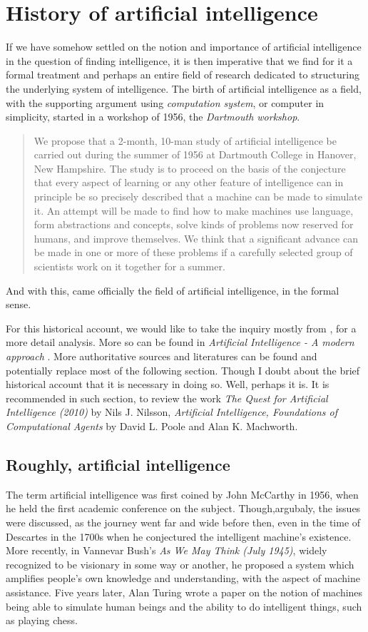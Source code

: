 \section{History of artificial intelligence}

If we have somehow settled on the notion and importance of artificial intelligence in the question of finding intelligence, it is then imperative that we find for it a formal treatment and perhaps an entire field of research dedicated to structuring the underlying system of intelligence. The birth of artificial intelligence as a field, with the supporting argument using \textit{computation system}, or computer in simplicity, started in a workshop of 1956, the \textit{Dartmouth workshop}. 

\blockquote{We propose that a 2-month, 10-man study of artificial intelligence be carried out during the summer of 1956 at Dartmouth College in Hanover, New Hampshire. The study is to proceed on the basis of the conjecture that every aspect of learning or any other feature of intelligence can in principle be so precisely described that a machine can be made to simulate it. An attempt will be made to find how to make machines use language, form abstractions and concepts, solve kinds of problems now reserved for humans, and improve themselves. We think that a significant advance can be made in one or more of these problems if a carefully selected group of scientists work on it together for a summer.}

And with this, came officially the field of artificial intelligence, in the formal sense. 

For this historical account, we would like to take the inquiry mostly from \cite{AIWashington}, for a more detail analysis. More so can be found in \textit{Artificial Intelligence - A modern approach} \cite{10.5555/1671238}. More authoritative sources and literatures can be found and potentially replace most of the following section. Though I doubt about the brief historical account that it is necessary in doing so. Well, perhaps it is. It is recommended in such section, to review the work \textit{The Quest for Artificial Intelligence (2010)} by Nils J. Nilsson, \textit{Artificial Intelligence, Foundations of Computational Agents} by David L. Poole and Alan K. Machworth. 
\subsection{Roughly, artificial intelligence}

The term artificial intelligence was first coined by John McCarthy in 1956, when he held the first academic conference on the subject. Though,argubaly, the issues were discussed, as the journey went far and wide before then, even in the time of Descartes in the 1700s when he conjectured the intelligent machine's existence. More recently, in Vannevar Bush's \textit{As We May Think (July 1945)}, widely recognized to be visionary in some way or another, he proposed a system which amplifies people's own knowledge and understanding, with the aspect of machine assistance. Five years later, Alan Turing wrote a paper on the notion of machines being able to simulate human beings and the ability to do intelligent things, such as playing chess. 

